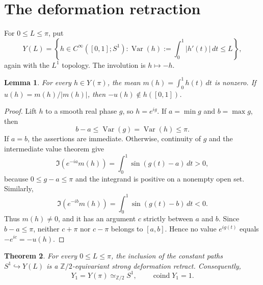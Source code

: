 \documentclass[10pt,a4paper]{article}
\newtheorem{theorem}{Theorem}
\newtheorem{lemma}[theorem]{Lemma}
\newcommand{\Var}{\operatorname{Var}}
\newcommand{\coind}{\operatorname{coind}}
\begin{document}
\section{The deformation retraction}

For \(0\leq L\leq\pi\), put
\[
 Y(L)=\left\{h\in C^\infty([0,1];S^1):
                \Var(h):=\int_0^1|h'(t)|\,dt\leq L\right\},
\]
again with the \(L^1\) topology.  The involution is \(h\mapsto-h\).

\begin{lemma}\label{lem:mean}
For every \(h\in Y(\pi)\), the mean
\(m(h)=\int_0^1h(t)\,dt\) is nonzero.  If
\(u(h)=m(h)/|m(h)|\), then \(-u(h)\notin h([0,1])\).
\end{lemma}

\begin{proof}
Lift \(h\) to a smooth real phase \(g\), so \(h=e^{ig}\).  If
\(a=\min g\) and \(b=\max g\), then
\[
 b-a\leq\Var(g)=\Var(h)\leq\pi.
\]
If \(a=b\), the assertions are immediate.  Otherwise, continuity of \(g\)
and the intermediate value theorem give
\[
 \Im\!\left(e^{-ia}m(h)\right)
 =\int_0^1\sin(g(t)-a)\,dt>0,
\]
because \(0\leq g-a\leq\pi\) and the integrand is positive on a nonempty
open set.  Similarly,
\[
 \Im\!\left(e^{-ib}m(h)\right)
 =\int_0^1\sin(g(t)-b)\,dt<0.
\]
Thus \(m(h)\neq0\), and it has an argument \(c\) strictly between \(a\) and
\(b\).  Since \(b-a\leq\pi\), neither \(c+\pi\) nor \(c-\pi\) belongs to
\([a,b]\).  Hence no value \(e^{ig(t)}\) equals \(-e^{ic}=-u(h)\).
\end{proof}

\begin{theorem}\label{thm:main}
For every \(0\leq L\leq\pi\), the inclusion of the constant paths
\(S^1\hookrightarrow Y(L)\) is a \(\mathbb Z/2\)-equivariant strong
deformation retract.  Consequently,
\[
 Y_1=Y(\pi)\simeq_{\mathbb Z/2}S^1,
 \qquad \coind Y_1=1.
\]
\end{theorem}
\end{document}
